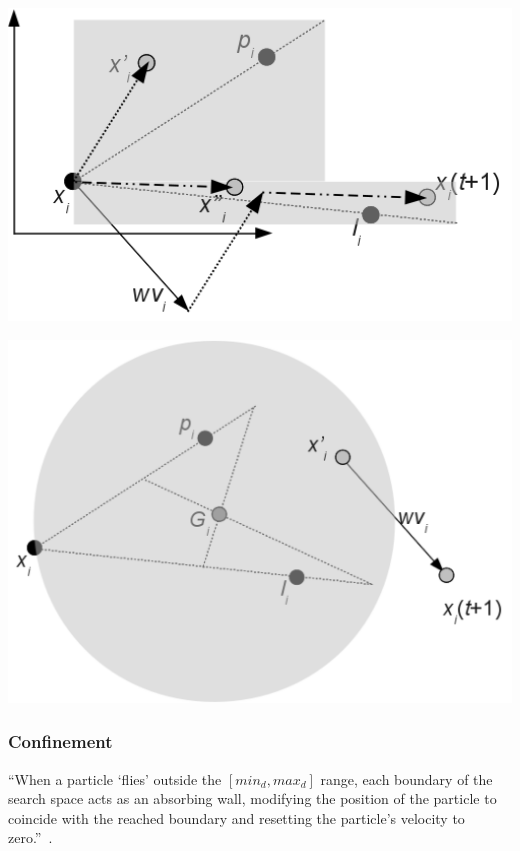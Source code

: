 \documentclass{csfourzero}
\newenvironment{Figure}
  {\par\medskip\noindent\minipage{\linewidth}}
  {\endminipage\par\medskip}
\begin{document}
\begin{multicols}{2}

\begin{Figure}
  \centering
  \includegraphics[width=0.8\linewidth]{dnpp_canonical.png}\label{fig:dnpp_canonical}
\end{Figure}

\begin{Figure}
  \centering
  \includegraphics[width=0.8\linewidth]{dnpp_spso11.png}\label{fig:dnpp_spso11}
\end{Figure}

\end{multicols}

\subsubsection{Confinement} %

``When a particle `flies' outside the $[min_d ,max_d]$ range, each boundary of
the search space acts as an absorbing wall, modifying the position of the
particle to coincide with the reached boundary and resetting the particle's
velocity to zero.''~\cite{ZambranoBigiarini:2013dl}.
\end{document}
